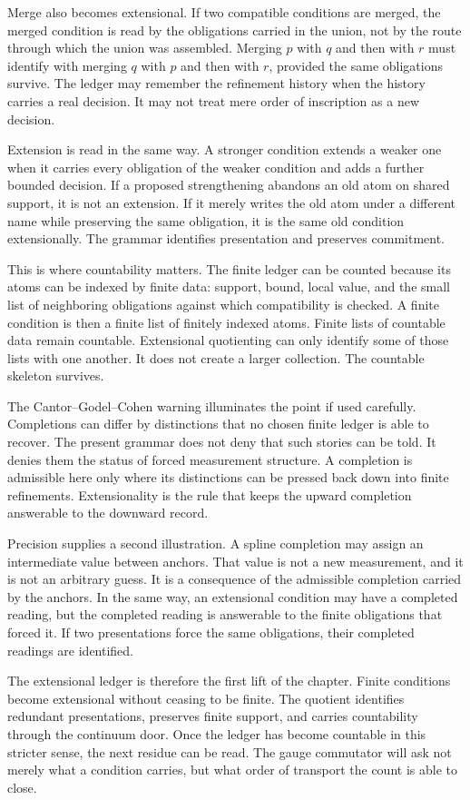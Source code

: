 Merge also becomes extensional. If two compatible conditions are merged, the
merged condition is read by the obligations carried in the union, not by the
route through which the union was assembled. Merging \(p\) with \(q\) and
then with \(r\) must identify with merging \(q\) with \(p\) and then with
\(r\), provided the same obligations survive. The ledger may remember the
refinement history when the history carries a real decision. It may not treat
mere order of inscription as a new decision.

Extension is read in the same way. A stronger condition extends a weaker one
when it carries every obligation of the weaker condition and adds a further
bounded decision. If a proposed strengthening abandons an old atom on shared
support, it is not an extension. If it merely writes the old atom under a
different name while preserving the same obligation, it is the same old
condition extensionally. The grammar identifies presentation and preserves
commitment.

This is where countability matters. The finite ledger can be counted because
its atoms can be indexed by finite data: support, bound, local value, and the
small list of neighboring obligations against which compatibility is checked.
A finite condition is then a finite list of finitely indexed atoms. Finite lists
of countable data remain countable. Extensional quotienting can only identify
some of those lists with one another. It does not create a larger collection.
The countable skeleton survives.

The Cantor--Godel--Cohen warning illuminates the point if used carefully.
Completions can differ by distinctions that no chosen finite ledger is able
to recover. The present grammar does not deny that such stories can be told.
It denies them the status of forced measurement structure. A completion is
admissible here only where its distinctions can be pressed back down into
finite refinements. Extensionality is the rule that keeps the upward
completion answerable to the downward record.

Precision supplies a second illustration. A spline completion may assign an
intermediate value between anchors. That value is not a new measurement, and
it is not an arbitrary guess. It is a consequence of the admissible completion
carried by the anchors. In the same way, an extensional condition may have a
completed reading, but the completed reading is answerable to the finite
obligations that forced it. If two presentations force the same obligations,
their completed readings are identified.

The extensional ledger is therefore the first lift of the chapter. Finite
conditions become extensional without ceasing to be finite. The quotient
identifies redundant presentations, preserves finite support, and carries
countability through the continuum door. Once the ledger has become
countable in this stricter sense, the next residue can be read. The gauge
commutator will ask not merely what a condition carries, but what order of
transport the count is able to close.
